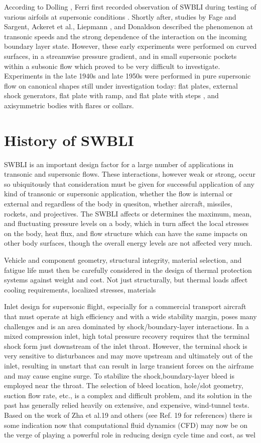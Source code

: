 According to Dolling \cite{Dolling2001}, Ferri first recorded observation of SWBLI during testing of various airfoils at supersonic conditions \cite{Ferri1938, Ferri1940}. Shortly after, studies by Fage and Sargent, Ackeret et al., Liepmann \cite{Liepmann1946}, and Donaldson described the phenomenon at transonic speeds and the strong dependence of the interaction on the incoming boundary layer state. However, these early experiments were performed on curved surfaces, in a streamwise pressure gradient, and in small supersonic pockets within a subsonic flow which proved to be very difficult to investigate. Experiments in the late 1940s and late 1950s were performed in pure supersonic flow on canonical shapes still under investigation today: flat plates, external shock generators, flat plate with ramp, and flat plate with steps \cite{Beastall1950}, and axisymmetric bodies with flares or collars. 

\section{History of SWBLI}
SWBLI is an important design factor for a large number of applications in transonic and supersonic flows. These interactions, however weak or strong, occur so ubiquitously that consideration must be given for successful application of any kind of transonic or supersonic application, whether the flow is internal or external and regardless of the body in quesiton, whether aircraft, missiles, rockets, and projectives. The SWBLI affects or determines the maximum, mean, and fluctuating pressure levels on a body, which in turn affect the local stresses on the body, heat flux, and flow structure which can have the same impacts on other body surfaces, though the overall energy levels are not affected very much. 

Vehicle and component geometry, structural integrity, material selection, and fatigue life must then be carefully considered in the design of thermal protection systems against weight and cost. Not just structurally, but thermal loads affect cooling requirements, localized stresses, materials

Inlet design for supersonic flight, especially for a commercial transport aircraft that must operate at high efficiency and with a wide stability margin, poses many challenges and is an area dominated by shock/boundary-layer interactions. In a mixed compression inlet, high total pressure recovery requires that the terminal shock form just downstream of the inlet throat. However, the terminal shock is very sensitive to disturbances and may move upstream and ultimately out of the inlet, resulting in unstart that can result in large transient forces on the airframe and may cause engine surge. To stabilize the shock,boundary-layer bleed is employed near the throat. The selection of bleed location, hole/slot geometry, suction flow rate, etc., is a complex and difficult problem, and its solution in the past has generally relied heavily on extensive, and expensive, wind-tunnel tests. Based on the work of Zha et al.19 and others (see Ref. 19 for references) there is some indication now that computational fluid dynamics (CFD) may now be on the verge of playing a powerful role in reducing design cycle time and cost, as wel

